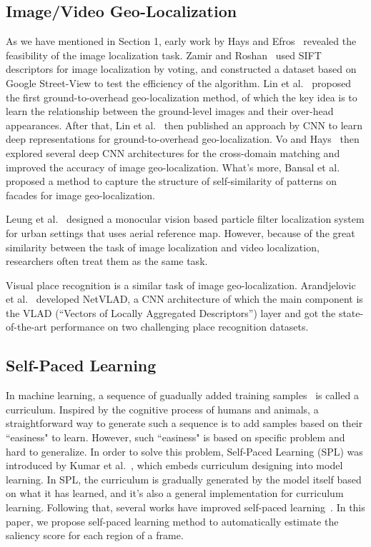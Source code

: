 \subsection{Image/Video Geo-Localization}
\par
As we have mentioned in Section 1, early work by Hays and Efros~\cite{hays2008im2gps} revealed the feasibility of the image localization task. Zamir and Roshan~\cite{zamir2010accurate} used SIFT descriptors for image localization by voting, and constructed a dataset based on Google Street-View to test the efficiency of the algorithm. Lin et al.~\cite{lin2013cross} proposed the first ground-to-overhead geo-localization method, of which the key idea is to learn the relationship between the ground-level images and their over-head appearances. After that, Lin et al.~\cite{lin2015learning} then published an approach by CNN to learn deep representations for ground-to-overhead geo-localization. Vo and Hays~\cite{vo2016localizing} then explored several deep CNN architectures for the cross-domain matching and improved the accuracy of image geo-localization. What's more, Bansal et al.~\cite{bansal2012ultra} proposed a method to capture the structure of self-similarity of patterns on facades for image geo-localization.
\par
Leung et al.~\cite{leung2008localization} designed a monocular vision based particle filter localization system for urban settings that uses aerial reference map. However, because of the great similarity between the task of image localization and video localization, researchers often treat them as the same task.
\par
Visual place recognition is a similar task of image geo-localization. Arandjelovic et al.~\cite{Arandjelovic16} developed NetVLAD, a CNN architecture of which the main component is the VLAD (``Vectors of Locally Aggregated Descriptors'') layer and got the state-of-the-art performance on two challenging place recognition datasets. 

\subsection{Self-Paced Learning}
\par
In machine learning, a sequence of guadually added training samples~\cite{bengio2009curriculum} is called a curriculum. Inspired by the cognitive process of humans and animals, a straightforward way to generate such a sequence is to add samples based on their ``easiness" to learn. However, such ``easiness" is based on specific problem and hard to generalize. In order to solve this problem, Self-Paced Learning (SPL) was introduced by Kumar et al.~\cite{kumar2010self}, which embeds curriculum designing into model learning. In SPL, the curriculum is gradually generated by the model itself based on what it has learned, and it's also a general implementation for curriculum learning. Following that, several works have improved self-paced learning~\cite{jiang2014easy, tang2012shifting, jiang2014self, jiang2015self}. In this paper, we propose self-paced learning method to automatically estimate the saliency score for each region of a frame.
